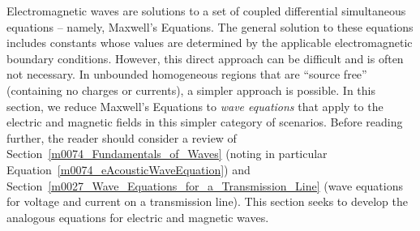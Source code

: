 


\label{m0036_Wave_Equations_SourceFree_Lossless} %

Electromagnetic waves are solutions to a set of coupled differential simultaneous equations -- namely, Maxwell's Equations.
The general solution to these equations includes constants whose values are determined by the applicable electromagnetic boundary conditions.
However, this direct approach can be difficult and is often not necessary.
In unbounded homogeneous regions that are ``source free'' (containing no charges or currents), a simpler approach is possible.
In this section, we reduce Maxwell's Equations to \emph{wave equations} that apply to the electric and magnetic fields in this simpler category of scenarios.
Before reading further, the reader should consider a review of Section~\ref{m0074_Fundamentals_of_Waves} (noting in particular Equation~\ref{m0074_eAcousticWaveEquation})
and Section~\ref{m0027_Wave_Equations_for_a_Transmission_Line} (wave equations for voltage and current on a transmission line).  
This section seeks to develop the analogous equations for electric and magnetic waves.

